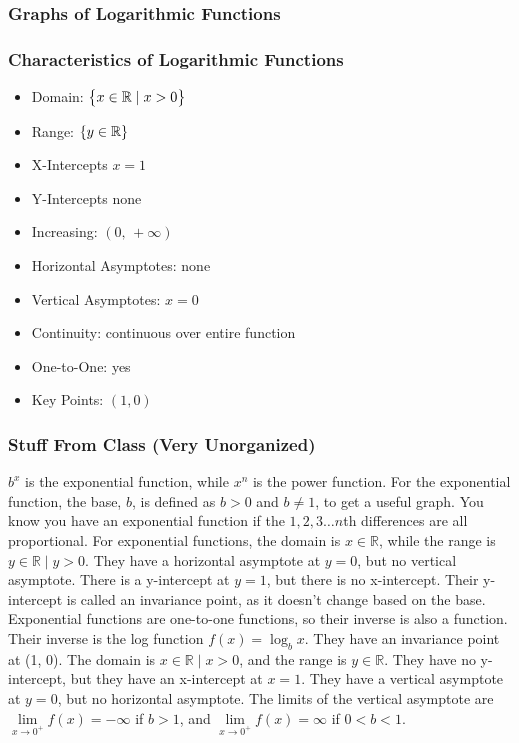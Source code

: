 \documentclass{article}
\begin{document}
	\subsubsection{Graphs of Logarithmic Functions}
	\subsubsection{Characteristics of Logarithmic Functions}
	\begin{itemize}
		\item Domain: $\set{x\in\mathbb{R}\mid x>0}$
		\item Range: $\set{y\in\mathbb{R}}$
		\item X-Intercepts $x=1$
		\item Y-Intercepts none
		\item Increasing: $(0,\,+\infty)$
		\item Horizontal Asymptotes: none
		\item Vertical Asymptotes: $x=0$
		\item Continuity: continuous over entire function
		\item One-to-One: yes
		\item Key Points: $(1, 0)$
	\end{itemize}
	\subsubsection{Stuff From Class (Very Unorganized)}
	$b^x$ is the exponential function, while $x^n$ is the power function. For the exponential function, the base, $b$, is defined as $b>0$ and $b\neq1$, to get a useful graph. You know you have an exponential function if the $1,2,3\dots n$th differences are all proportional.%
	For exponential functions, the domain is $x\in\mathbb{R}$, while the range is $y\in\mathbb{R}\mid y>0$. They have a horizontal asymptote at $y=0$, but no vertical asymptote. There is a y-intercept at $y=1$, but there is no x-intercept. Their y-intercept is called an invariance point, as it doesn't change based on the base. Exponential functions are one-to-one functions, so their inverse is also a function.\\
	Their inverse is the log function $f(x)=\log_bx$. They have an invariance point at (1, 0). The domain is $x\in\mathbb{R}\mid x>0$, and the range is $y\in\mathbb{R}$.  They have no y-intercept, but they have an x-intercept at $x=1$. They have a vertical asymptote at $y=0$, but no horizontal asymptote. The limits of the vertical asymptote are $\lim\limits_{x\to0^+}f(x)=-\infty$ if $b>1$, and $\lim\limits_{x\to0^+}f(x)=\infty$ if $0<b<1$.
\end{document}
